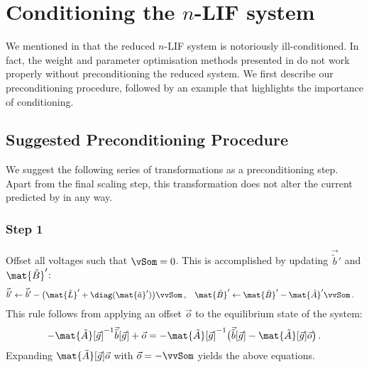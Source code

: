 
\section{Conditioning the $n$-LIF system}
\label{app:nlif_conditioning}

We mentioned in  that the reduced $n$-LIF system is notoriously ill-conditioned.
In fact, the weight and parameter optimisation methods presented in  do not work properly without preconditioning the reduced system.
We first describe our preconditioning procedure, followed by an example that highlights the importance of conditioning.

\subsection{Suggested Preconditioning Procedure}

We suggest the following series of transformations as a preconditioning step.
Apart from the final scaling step, this transformation does not alter the current predicted by \Hden in any way.

\subsubsection{Step 1}
Offset all voltages such that $\vSom = 0$.
This is accomplished by updating $\vec{\tilde b}'$ and $\mat{\tilde B}'$:
\begin{align*}
	\vec{\tilde b}' &\gets \vec{\tilde b}' - \bigl(\mat{\tilde L}' + \diag(\mat{\tilde a}') \bigr) \vvSom \,, &
	\mat{\tilde B}' &\gets \mat{\tilde B}' - \mat{\tilde A}' \vvSom \,.
\end{align*}
This rule follows from applying an offset $\vec o$ to the equilibrium state of the \nlif system:
\begin{align*}
	  -\mat{\tilde A}[\vec g]^{-1} \vec{\tilde b}[\vec g] + \vec o
	= -\mat{\tilde A}[\vec g]^{-1} \bigl(\vec{\tilde b}[\vec g] - \mat{\tilde A}[\vec g] \vec o \bigr) \,.
\end{align*}
Expanding $\mat{\tilde A}[\vec g] \vec o$ with $\vec o = -\vvSom$ yields the above equations.

